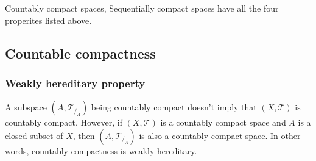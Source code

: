 	Countably compact spaces, Sequentially compact spaces have all the four properites listed above.

\subsection{Countable compactness}
\subsubsection{Weakly hereditary property}
	A subspace $(A,\mathcal{T}_{/_A})$ being countably compact doesn't imply that $(X,\mathcal{T})$ is countably compact. However, if $(X,\mathcal{T})$ is a countably compact space and \textsf{$A$ is a closed subset of $X$}, then $(A,\mathcal{T}_{/_A})$ is also a countably compact space. In other words, countably compactness is weakly hereditary.

